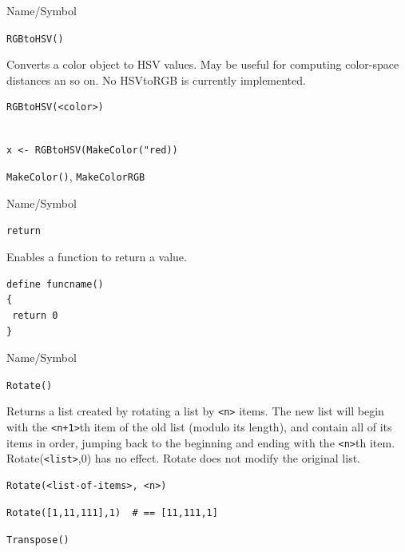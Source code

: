 \begin{desc}{Name/Symbol}
\item[Name/Symbol]  \verb+RGBtoHSV()+

\item[Description]  Converts a color object to HSV values.  May be useful for computing color-space
distances an so on.  No HSVtoRGB is currently implemented.

\item[Usage]        	
\begin{verbatim}
RGBtoHSV(<color>)
\end{verbatim}
			  
\item[Example]     	
\begin{verbatim}

x <- RGBtoHSV(MakeColor("red))

\end{verbatim}

\item[See Also]	
   \verb+MakeColor()+, \verb+MakeColorRGB+
\end{desc}

\begin{desc}{Name/Symbol}
\item[Name/Symbol] 	\verb+return+

\item[Description]  	Enables a function to return a value.

\item[Usage]
\begin{verbatim}
define funcname()
{
 return 0
}
\end{verbatim}

\item[Example]	

\item[See Also]	
\end{desc}

\begin{desc}{Name/Symbol}
\item[Name/Symbol]	\verb+Rotate()+

\item[Description] 	Returns a list created by rotating a list by \verb!<n>! items.  
		The new list will begin with the \verb!<n+1>!th item of the old 
		list (modulo its length), and contain all of its items in 
		order, jumping back to the beginning and ending with the \verb!<n>!th
		item. Rotate(\verb!<list>!,0) has no effect.  Rotate does not modify 
		the original list.

\item[Usage]
\begin{verbatim}
Rotate(<list-of-items>, <n>)
\end{verbatim}

\item[Example]     	
\begin{verbatim}
Rotate([1,11,111],1)  # == [11,111,1]
\end{verbatim}

\item[See Also]    	\verb+Transpose()+
\end{desc}


